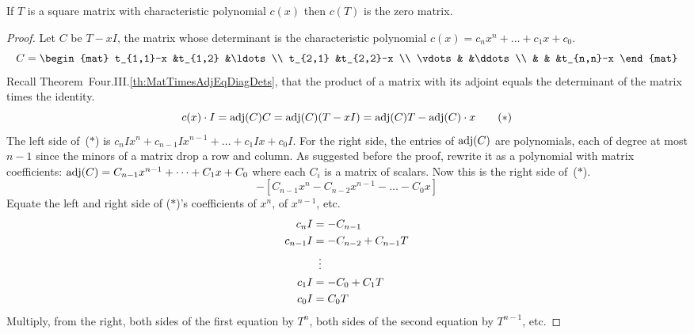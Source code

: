 \begin{lemma}   \label{le:MatSatItsCharPoly}
If \( T \) is a square matrix with characteristic polynomial \( c(x) \)
then \( c(T) \) is the zero matrix.
\end{lemma}

\begin{proof}
Let \( C \) be \( T-xI \),
the matrix whose determinant is the characteristic polynomial
\( c(x)=c_nx^n+\dots+c_1x+c_0 \).
\begin{equation*}
  C=\begin{mat}
    t_{1,1}-x        &t_{1,2}   &\ldots        \\
    t_{2,1}          &t_{2,2}-x               \\
    \vdots           &          &\ddots       \\
                     &          &       &t_{n,n}-x
  \end{mat}
\end{equation*}
Recall Theorem~Four.III.\ref{th:MatTimesAdjEqDiagDets},
that the product of a matrix with its adjoint equals
the determinant of the matrix times the identity.
\begin{equation*}
  c(x)\cdot I
  =\operatorname{adj} (C)C
  =\operatorname{adj} (C)(T-xI)
  =\operatorname{adj} (C)T- \operatorname{adj}(C)\cdot x
\tag*{($*$)}
\end{equation*}
The left side of~($*$) is 
$c_nIx^n+c_{n-1}Ix^{n-1}+\dots+c_1Ix+c_0I$.
For the right side,
the entries of \( \operatorname{adj} (C) \) are polynomials, each of degree
at most \( n-1 \) since the minors of a matrix drop a row and column.
As suggested before the proof, rewrite it as a polynomial with
matrix coefficients:
\( \operatorname{adj} (C)=C_{n-1}x^{n-1}+\dots+C_1x+C_0 \)
where each \( C_i \) is a matrix of scalars.
Now this is the right side of~($*$).
\begin{equation*}
  [(C_{n-1}T)x^{n-1}+\dots+(C_1T)x+C_0T]  
   -[C_{n-1}x^n-C_{n-2}x^{n-1}-\dots-C_0x]
\end{equation*}
Equate the left and right side of ($*$)'s
coefficients of \( x^n \), of $x^{n-1}$, etc.
\begin{align*}
  c_nI
  &=-C_{n-1}    \\
  c_{n-1}I
  &=-C_{n-2}+C_{n-1}T    \\
  &\vdotswithin{=}             \\
  c_{1}I
  &=-C_{0}+C_{1}T    \\
  c_{0}I
  &=C_{0}T
\end{align*}
Multiply, from the right, both sides of the first equation by \( T^n \), 
both sides of the second equation by \( T^{n-1} \), etc.

\end{proof}
